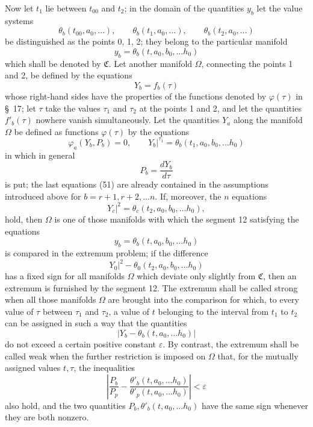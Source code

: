 \documentclass[11pt,a4paper,leqno]{article}
\begin{document}
Now let $t_1$ lie between $t_{00}$ and $t_2$; in the domain of the quantities $y_b$ let the value systems
\[
\theta_b(t_{00},a_0,\ldots),
\qquad
\theta_b(t_1,a_0,\ldots),
\qquad
\theta_b(t_2,a_0,\ldots)
\]
be distinguished as the points 0, 1, 2; they belong to the particular manifold
\[
y_b=\theta_b(t,a_0,b_0,\ldots h_0)
\]
which shall be denoted by $\mathfrak{C}$. Let another manifold $\Omega$, connecting the points 1 and 2, be defined by the equations
\[
Y_b=f_b(\tau)
\]
whose right-hand sides have the properties of the functions denoted by $\varphi(\tau)$ in \S~17; let $\tau$ take the values $\tau_1$ and $\tau_2$ at the points 1 and 2, and let the quantities $f'_b(\tau)$
nowhere vanish simultaneously. Let the quantities $Y_a$ along the manifold $\Omega$ be defined as functions $\varphi(\tau)$ by the equations
\begin{equation}\tag{51}
\varphi_a(Y_b,P_b)=0,
\qquad
\left.Y_b\right|^{\tau_1}=\theta_b(t_1,a_0,b_0,\ldots h_0)
\end{equation}
in which in general
\[
P_b=\frac{dY_b}{d\tau}
\]
is put; the last equations (51) are already contained in the assumptions introduced above for $b=r+1,r+2,\ldots n$. If, moreover, the $n$ equations
\[
\left.Y_c\right|^2=\theta_c(t_2,a_0,b_0,\ldots h_0),
\]
hold, then $\Omega$ is one of those manifolds with which the segment 12 satisfying the equations
\[
y_b=\theta_b(t,a_0,b_0,\ldots h_0)
\]
is compared in the extremum problem; if the difference
\[
\left.Y_0\right|^2-\theta_0(t_2,a_0,b_0,\ldots h_0)
\]
has a fixed sign for all manifolds $\Omega$ which deviate only slightly from $\mathfrak{C}$, then an extremum is furnished by the segment 12. The extremum shall be called strong when all those manifolds $\Omega$ are brought into the comparison for which, to every value of $\tau$ between $\tau_1$ and $\tau_2$, a value of $t$ belonging to the interval from $t_1$ to $t_2$ can be assigned in such a way that the quantities
\[
\left|Y_b-\theta_b(t,a_0,\ldots h_0)\right|
\]
do not exceed a certain positive constant $\varepsilon$. By contrast, the extremum shall be called weak when the further restriction is imposed on $\Omega$ that, for the mutually assigned values $t,\tau$, the inequalities
\begin{equation}\tag{52}
\left|
\frac{P_b}{P_p}
-\frac{\theta'_b(t,a_0,\ldots h_0)}{\theta'_p(t,a_0,\ldots h_0)}
\right|<\varepsilon
\end{equation}
also hold, and the two quantities $P_b,\theta'_b(t,a_0,\ldots h_0)$ have the same sign whenever they are both nonzero.
\end{document}
